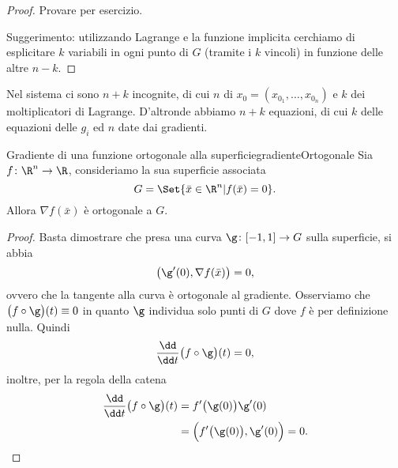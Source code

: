 \begin{proof}
	Provare per esercizio.

	Suggerimento: utilizzando Lagrange e la funzione implicita cerchiamo di esplicitare \(k\) variabili in ogni punto di \(G\) (tramite i \(k\) vincoli) in funzione delle altre \(n-k\).
\end{proof}

\begin{oss}
	Nel sistema ci sono \(n+k\) incognite, di cui \(n\) di \(x_0=(x_{0_1},\dots,x_{0_n})\) e \(k\) dei moltiplicatori di Lagrange.
	D'altronde abbiamo \(n+k\) equazioni, di cui \(k\) delle equazioni delle \(g_i\) ed \(n\) date dai gradienti.
\end{oss}

\begin{prop}{Gradiente di una funzione ortogonale alla superficie}{gradienteOrtogonale}
	Sia \(f\colon\R^n\to\R\), consideriamo la sua superficie associata
	\[
		G=\Set{\bar{x}\in\R^n | f(\bar{x})=0}.
	\]
	Allora \(\nabla f(\bar{x})\) è ortogonale a \(G\).
\end{prop}

\begin{proof}
	Basta dimostrare che presa una curva \(\g\colon[-1,1]\to G\) sulla superficie, si abbia
	\[
		\big(\g'(0),\nabla f(\bar{x})\big)=0,
	\]
	ovvero che la tangente alla curva è ortogonale al gradiente.
	Osserviamo che \(\big(f\circ\g\big)(t)\equiv 0\) in quanto \(\g\) individua solo punti di \(G\) dove \(f\) è per definizione nulla.
	Quindi
	\[
		\frac{\dd}{\dd t}\big(f\circ \g\big)(t)=0,
	\]
	inoltre, per la regola della catena
	\[
		\begin{split}
			\frac{\dd}{\dd t}\big(f\circ \g\big)(t) & =f'\big(\g(0)\big)\g'(0)\\
			& =\Big(f'\big(\g(0)\big),\g'(0)\Big)=0.\qedhere
		\end{split}
	\]
\end{proof}